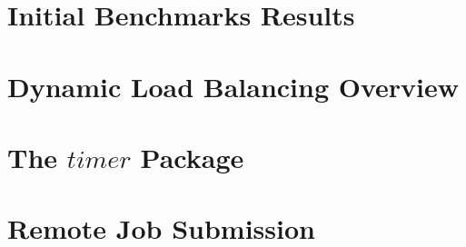\appendix
\section{Initial Benchmarks Results} 
\section{Dynamic Load Balancing Overview} 
\section{The $timer$ Package} 
\section{Remote Job Submission} 